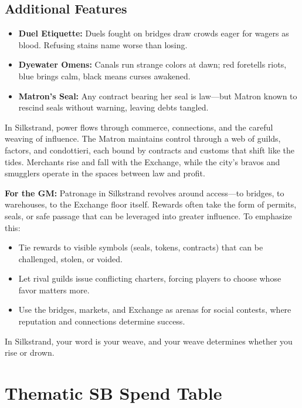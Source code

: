 \subsection*{Additional Features}
\begin{itemize}
\item \textbf{Duel Etiquette:} Duels fought on bridges draw crowds eager for wagers as blood. Refusing stains name worse than losing.
\item \textbf{Dyewater Omens:} Canals run strange colors at dawn; red foretells riots, blue brings calm, black means curses awakened.
\item \textbf{Matron's Seal:} Any contract bearing her seal is law---but Matron known to rescind seals without warning, leaving debts tangled.
\end{itemize}

\begin{tcolorbox}[colback=black!3,colframe=black!40!white,title={Patronage \& Power}]
In Silkstrand, power flows through commerce, connections, and the careful weaving of influence. The Matron maintains control through a web of guilds, factors, and condottieri, each bound by contracts and customs that shift like the tides. Merchants rise and fall with the Exchange, while the city's bravos and smugglers operate in the spaces between law and profit.

\textbf{For the GM:}  
Patronage in Silkstrand revolves around access---to bridges, to warehouses, to the Exchange floor itself. Rewards often take the form of permits, seals, or safe passage that can be leveraged into greater influence. To emphasize this:
\begin{itemize}
\item Tie rewards to visible symbols (seals, tokens, contracts) that can be challenged, stolen, or voided.
\item Let rival guilds issue conflicting charters, forcing players to choose whose favor matters more.
\item Use the bridges, markets, and Exchange as arenas for social contests, where reputation and connections determine success.
\end{itemize}
In Silkstrand, your word is your weave, and your weave determines whether you rise or drown.
\end{tcolorbox}


\section*{Thematic SB Spend Table}
\label{sec:silkstrand-sb}


